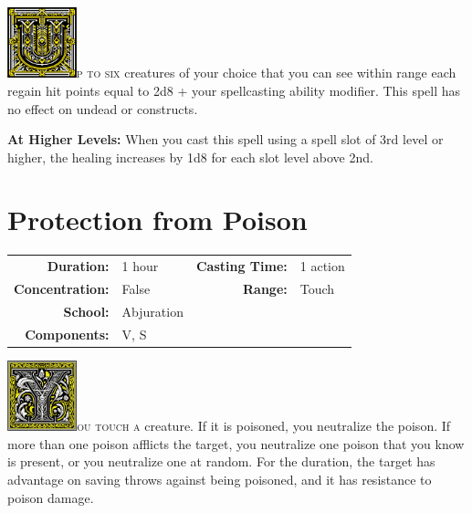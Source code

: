 \documentclass[12pt,showtrims]{memoir}
\begin{document}
\vspace{1\baselineskip}\noindent
\lettrine[lines=4]{\includegraphics[height=58pt]{initials/U.png}}{p to six} creatures of your choice that you can see within range each regain hit points equal to 2d8 + your spellcasting ability modifier. This spell has no effect on undead or constructs.

\vspace{8pt} \noindent\textbf{At Higher Levels:} When you cast this spell using a spell slot of 3rd level or higher, the healing increases by 1d8 for each slot level above 2nd.
\newpage
\section*{Protection from Poison}

{
\small\centering\vspace{-6pt}
\begin{tabular}{rlrl}
\toprule

\textbf{Duration:} & 1 hour &
\textbf{Casting Time:} & 1 action \\
\textbf{Concentration:} & False &
\textbf{Range:} & Touch \\
\textbf{School:} & Abjuration \\
\textbf{Components:} & \multicolumn{3}{p{0.7\textwidth}}{V, S}\\

\bottomrule
\end{tabular}
}

\vspace{1\baselineskip}\noindent 
\lettrine[lines=4]{\includegraphics[height=58pt]{initials/Y.png}}{ou touch a} creature. If it is poisoned, you neutralize the poison. If more than one poison afflicts the target, you neutralize one poison that you know is present, or you neutralize one at random. For the duration, the target has advantage on saving throws against being poisoned, and it has resistance to poison damage.

\newpage
\end{document}
